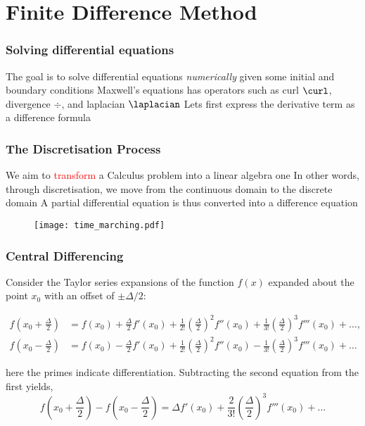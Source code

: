 \documentclass[10pt]{beamer}
\begin{document}
\section{Finite Difference Method}
\begin{frame}
    \frametitle{Solving differential equations}
    \begin{outline}
        \1 The goal is to solve differential equations \textit{numerically} given some initial and boundary conditions
        \1 Maxwell's equations has operators such as curl $\curl$, divergence $\div$, and laplacian $\laplacian$
        \1 Lets first express the derivative term as a difference formula
    \end{outline}

\end{frame}

\begin{frame}
    \frametitle{The Discretisation Process}

    \begin{outline}
        \1 We aim to \textcolor{red}{transform} a Calculus problem into a linear algebra one
        \1 In other words, through discretisation, we move from the continuous domain to the discrete domain
        \1 A partial differential equation is thus converted into a difference equation
    \end{outline}
    \begin{figure}[htbp]
        \centering
        \texttt{[image: time\_marching.pdf]}

    \end{figure}

\end{frame}

\begin{frame}
    \frametitle{Central Differencing}
    Consider the Taylor series expansions of the function $f(x)$ expanded about the
    point $x_0$ with an offset of $\pm\Delta/2$:

    \begin{align*}
        f(x_0 + \frac{\Delta}{2}) & = f(x_0) + \frac{\Delta}{2} f'(x_0) +
        \frac{1}{2!}\left(\frac{\Delta}{2}\right)^2 f''(x_0) +
        \frac{1}{3!}\left(\frac{\Delta}{2}\right)^3 f'''(x_0) + \ldots,   \\
        f(x_0 - \frac{\Delta}{2}) & = f(x_0) - \frac{\Delta}{2} f'(x_0) +
        \frac{1}{2!}\left(\frac{\Delta}{2}\right)^2 f''(x_0) -
        \frac{1}{3!}\left(\frac{\Delta}{2}\right)^3 f'''(x_0) + \ldots
    \end{align*}

    here the primes indicate differentiation. Subtracting the second equation from the first yields,
    \begin{equation}
        f\left(x_0+\frac{\Delta}{2}\right) -
        f\left(x_0-\frac{\Delta}{2}\right) =
        \Delta f'(x_0) +
        \frac{2}{3!}\left(\frac{\Delta}{2}\right)^3 f'''(x_0) + \ldots
        \label{eq:diff}
    \end{equation}
\end{frame}
\end{document}
